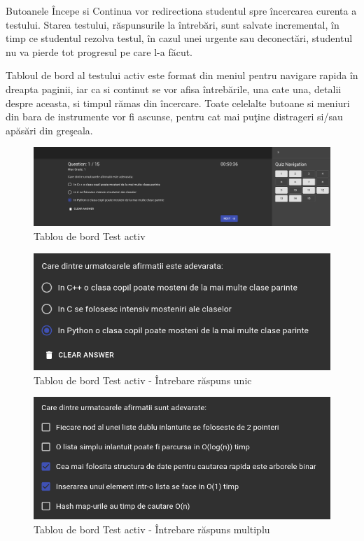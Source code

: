 \documentclass[12pt, a4paper, oneside, romanian]{teza-upb}
\begin{document}
Butoanele Începe si Continua vor redirectiona studentul spre încercarea curenta a testului. Starea testului, răspunsurile la întrebări, sunt salvate incremental, în timp ce studentul rezolva testul, în cazul unei urgente sau deconectări, studentul nu va pierde tot progresul pe care l-a făcut.

Tabloul de bord al testului activ este format din meniul pentru navigare rapida în dreapta paginii, iar ca si continut se vor afisa întrebările, una cate una, detalii despre aceasta, si timpul rămas din încercare. Toate celelalte butoane si meniuri din bara de instrumente vor fi ascunse, pentru cat mai puţine distrageri si/sau apăsări din greşeala.

\begin{figure}[H]
\centering
\includegraphics*[width=\columnwidth]{tablou-de-bord-test-activ}
\caption{Tablou de bord Test activ}
\label{tablou-de-bord-test-activ}
\end{figure}

\begin{figure}[H]
\centering
\includegraphics*[width=0.7\columnwidth]{tablou-de-bord-test-activ-intrebare-raspuns-unic}
\caption{Tablou de bord Test activ - Întrebare răspuns unic}
\label{tablou-de-bord-test-activ-intrebare-raspuns-unic}
\end{figure}

\begin{figure}[H]
\centering
\includegraphics*[width=0.7\columnwidth]{tablou-de-bord-test-activ-intrebare-raspuns-multiplu}
\caption{Tablou de bord Test activ - Întrebare răspuns multiplu}
\label{tablou-de-bord-test-activ-intrebare-raspuns-multiplu}
\end{figure}
\end{document}
